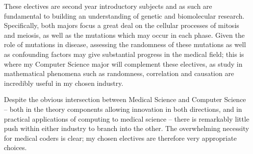 These electives are second year introductory subjects and as such are fundamental to building an understanding of genetic and biomolecular research. Specifically, both majors focus a great deal on the cellular processes of mitosis and meiosis, as well as the mutations which may occur in each phase. Given the role of mutations in disease, assessing the randomness of these mutations as well as confounding factors may give substantial progress in the medical field; this is where my Computer Science major will complement these electives, as study in mathematical phenomena such as randomness, correlation and causation are incredibly useful in my chosen industry.

Despite the obvious intersection between Medical Science and Computer Science – both in the theory components allowing innovation in both directions, and in practical applications of computing to medical science – there is remarkably little push within either industry to branch into the other. The overwhelming necessity for medical coders is clear; my chosen electives are therefore very appropriate choices.
